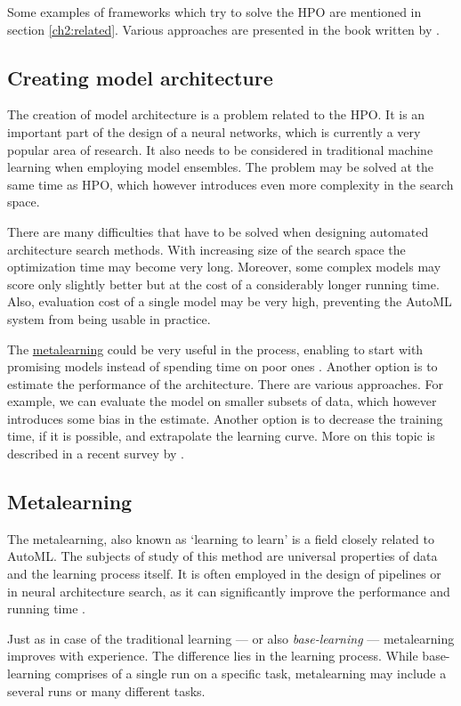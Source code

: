Some examples of frameworks which try to solve the HPO are mentioned in section
\ref{ch2:related}. Various approaches are presented in the book written by
\cite{automl_book}.

\subsection{Creating model architecture}
The creation of model architecture is a problem related to the HPO. It is an
important part of the design of a neural networks, which is currently a very
popular area of research. It also needs to be considered in traditional machine
learning when employing model ensembles. The problem may be solved at the same
time as HPO, which however introduces even more complexity in the search space.

There are many difficulties that have to be solved when designing automated
architecture search methods. With increasing size of the search space 
the optimization time may become very long.
Moreover, some complex models may score only slightly better
but at the cost of a considerably longer running time. Also, evaluation cost of
a single model may be very high, preventing the AutoML system from being usable
in practice.

The \hyperref[metalearning]{metalearning} could be very useful in the process,
enabling to start with promising models instead of spending time on poor ones
\citep{DBLP:journals/corr/abs-1810-03548}.
Another option is to estimate the performance of the architecture. There are
various approaches. For example, we can evaluate the model on smaller subsets of
data, which however introduces some bias in the estimate. Another option is to
decrease the training time, if it is possible, and extrapolate the learning
curve. More on this topic is described in a recent survey by
\cite{2018arXiv180805377E}.

\subsection{Metalearning} \label{metalearning}
The metalearning, also known as `learning to learn' is a field closely related
to AutoML. The subjects of study of this method are universal properties of 
data and the learning process itself. It is often employed in the design of
pipelines or in neural architecture search, as it can significantly
improve the performance and running time
\citep{DBLP:journals/corr/abs-1810-03548}.

Just as in case of the traditional learning --- or also \emph{base-learning}
--- metalearning improves with experience. The difference lies in the learning
process. While base-learning comprises of a single run on a specific task,
metalearning may include a several runs or many different tasks. 

